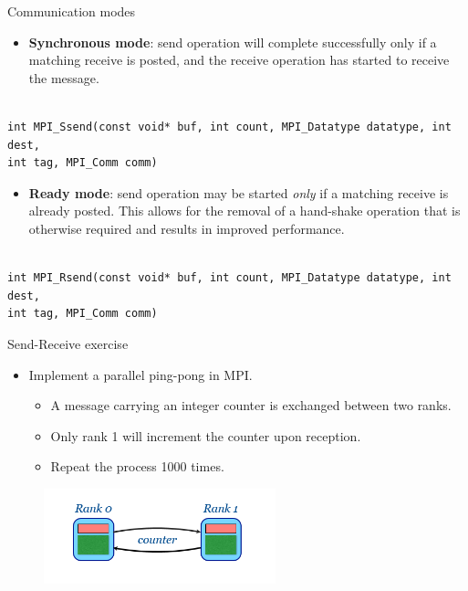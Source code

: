 \begin{frame}[fragile]{Communication modes}

\begin{itemize}
\item \textbf{Synchronous mode}: send operation will complete successfully only if a matching receive is posted, and the receive operation has started to receive the message. 
\end{itemize}
\small\begin{verbatim}

int MPI_Ssend(const void* buf, int count, MPI_Datatype datatype, int dest,
int tag, MPI_Comm comm)
\end{verbatim}
\normalsize
  
\begin{itemize}
\item \textbf{Ready mode}: send operation may be started \textit{only} if a matching receive is already posted. This allows for the removal of a hand-shake operation that is otherwise
required and results in improved performance.
\end{itemize}

\small\begin{verbatim}

int MPI_Rsend(const void* buf, int count, MPI_Datatype datatype, int dest,
int tag, MPI_Comm comm)

\end{verbatim}
\normalsize

\end{frame}


\begin{frame}[fragile]{Send-Receive exercise}

\begin{itemize}
\item Implement a parallel ping-pong in MPI.
    \begin{itemize}
    \item A message carrying an integer counter is exchanged between two ranks.
      \vspace{2mm}
    \item Only rank 1 will increment the counter upon reception.
      \vspace{2mm}
    \item Repeat the process 1000 times.
    \end{itemize}
\end{itemize}

\begin{figure}
    \centering
    \includegraphics[width=0.6\textwidth]{img/pingpongMPI.png}
\end{figure} 
   
 
    
\end{frame}

